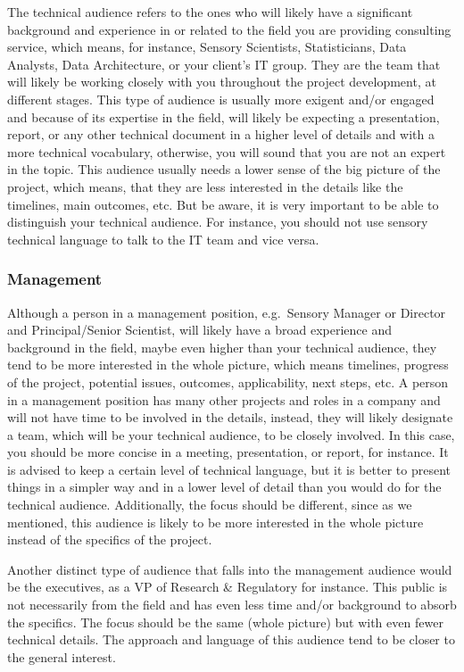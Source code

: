 \documentclass[
]{book}
\begin{document}
The technical audience refers to the ones who will likely have a significant background and experience in or related to the field you are providing consulting service, which means, for instance, Sensory Scientists, Statisticians, Data Analysts, Data Architecture, or your client's IT group. They are the team that will likely be working closely with you throughout the project development, at different stages. This type of audience is usually more exigent and/or engaged and because of its expertise in the field, will likely be expecting a presentation, report, or any other technical document in a higher level of details and with a more technical vocabulary, otherwise, you will sound that you are not an expert in the topic. This audience usually needs a lower sense of the big picture of the project, which means, that they are less interested in the details like the timelines, main outcomes, etc. But be aware, it is very important to be able to distinguish your technical audience. For instance, you should not use sensory technical language to talk to the IT team and vice versa.

\hypertarget{management}{%
\subsubsection{Management}\label{management}}

Although a person in a management position, e.g.~Sensory Manager or Director and Principal/Senior Scientist, will likely have a broad experience and background in the field, maybe even higher than your technical audience, they tend to be more interested in the whole picture, which means timelines, progress of the project, potential issues, outcomes, applicability, next steps, etc. A person in a management position has many other projects and roles in a company and will not have time to be involved in the details, instead, they will likely designate a team, which will be your technical audience, to be closely involved. In this case, you should be more concise in a meeting, presentation, or report, for instance. It is advised to keep a certain level of technical language, but it is better to present things in a simpler way and in a lower level of detail than you would do for the technical audience. Additionally, the focus should be different, since as we mentioned, this audience is likely to be more interested in the whole picture instead of the specifics of the project.

Another distinct type of audience that falls into the management audience would be the executives, as a VP of Research \& Regulatory for instance. This public is not necessarily from the field and has even less time and/or background to absorb the specifics. The focus should be the same (whole picture) but with even fewer technical details. The approach and language of this audience tend to be closer to the general interest.
\end{document}
